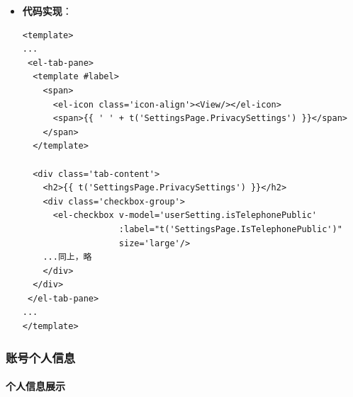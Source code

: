 \begin{itemize}
	\item \textbf{代码实现}：
	\begin{verbatim}
<template>
...
 <el-tab-pane>
  <template #label>
    <span>
      <el-icon class='icon-align'><View/></el-icon>
      <span>{{ ' ' + t('SettingsPage.PrivacySettings') }}</span>
    </span>
  </template>
	
  <div class='tab-content'>
    <h2>{{ t('SettingsPage.PrivacySettings') }}</h2>
    <div class='checkbox-group'>
      <el-checkbox v-model='userSetting.isTelephonePublic'
                   :label="t('SettingsPage.IsTelephonePublic')"
                   size='large'/>
    ...同上，略
    </div>
  </div>
 </el-tab-pane>
...
</template>
	\end{verbatim}

\end{itemize}

\subsubsection{账号个人信息}

\paragraph{个人信息展示}

